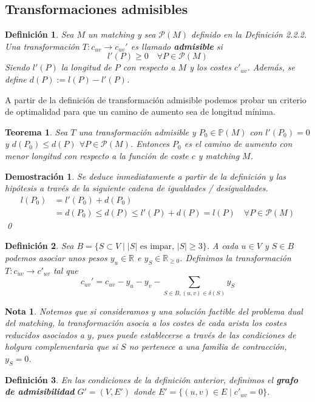 \documentclass[twoside,a4paper,openright,12pt,tikz]{book}
\newtheorem{defi}{Definici\'on}[section]
\newtheorem{nota}{Nota}[section]
\newtheorem{thm}{Teorema}[section]
\newtheorem*{dem}{Demostración}
\newcommand{\R}{\mathbb{R}}
\begin{document}
\subsection{Transformaciones admisibles}
\begin{defi}
Sea $M$ un matching y sea $\mathcal{P}(M)$ definido en la Definición 2.2.2. Una transformación $T:c_{uv}\to c_{uv}'$ es llamado \textbf{admisible} si
$$
l'(P)\geq 0\quad \forall P \in \mathcal{P}(M)
$$
Siendo $l'(P)$ la longitud de $P$ con respecto a $M$ y los costes $c'_{uv}$. Además, se define $d(P):= l(P)-l'(P)$.
\end{defi}
A partir de la definición de transformación admisible podemos probar un criterio de optimalidad para que un camino de aumento sea de longitud mínima.
\begin{thm}
Sea $T$ una transformación admisible y $P_0 \in \mathbb{P}(M)$ con $l'(P_0) =0$ y 	$d(P_0)\leq d(P)$ $\forall P \in \mathcal{P}(M)$. Entonces $P_0$ es el camino de aumento con menor longitud con respecto a la función de coste $c$ y matching $M$.
\end{thm}
\begin{dem}
Se deduce inmediatamente a partir de la definición y las hipótesis a través de la siguiente cadena de igualdades / desigualdades.
\begin{align*}
l(P_0) &= l'(P_0) + d(P_0)\\
&=d(P_0)\leq d(P) \leq l'(P) + d(P) = l(P)  \quad \forall P \in \mathcal{P}(M)
\end{align*}
\qed
\end{dem}
\begin{defi}
Sea $B=\{S\subset V \mid |S| \text{ es impar, }|S|\geq 3\}$. A cada $u\in V$ y $S\in B$ podemos asociar unos pesos $y_u \in \R$ e $y_S \in \R_{\geq 0}$. Definimos la transformación $T:c_{uv}\to c'_{uv}$ tal que
$$
c_{uv}' =c_{uv}-y_u-y_v - \sum_{S\in B, (u,v)\in \delta(S)}y_S
$$
\end{defi}
\begin{nota}
Notemos que si consideramos $y$ una solución factible del problema dual del matching, la transformación asocia a los costes de cada arista los costes reducidos asociados a $y$, pues puede establecerse a través de las condiciones de holgura complementaria que si $S$ no pertenece a una familia de contracción, $y_S =0$.
\end{nota}
\begin{defi}
En las condiciones de la definición anterior, definimos el \textbf{grafo de admisibilidad} $G' = (V,E')$ donde $E' = \{(u,v)\in E\mid c'_{uv}=0\}$.
\end{defi}
\end{document}
